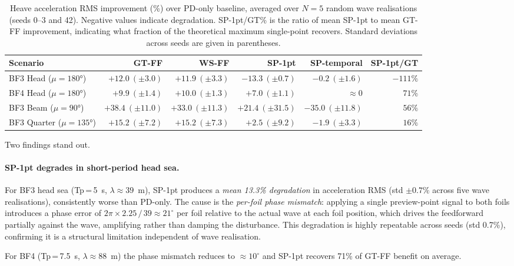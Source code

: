 \documentclass[review]{elsarticle}
\begin{document}
\begin{table}[t]
\centering
\caption{Heave acceleration RMS improvement (\%) over PD-only baseline,
  averaged over $N{=}5$ random wave realisations (seeds 0--3 and 42).
  Negative values indicate degradation.  SP-1pt/GT\% is the ratio of
  mean SP-1pt to mean GT-FF improvement, indicating what fraction of the
  theoretical maximum single-point recovers.  Standard deviations across
  seeds are given in parentheses.}
\label{tab:single_point}
\begin{tabular}{lrrrrr}
\toprule
Scenario & GT-FF & WS-FF & SP-1pt & SP-temporal & SP-1pt/GT \\
\midrule
BF3 Head ($\mu{=}180°$) & $+12.0\ (\pm3.0)$ & $+11.9\ (\pm3.3)$ & $\mathbf{-13.3}\ (\pm0.7)$ & $-0.2\ (\pm1.6)$  & $-111\%$ \\
BF4 Head ($\mu{=}180°$) & $+9.9\  (\pm1.4)$ & $+10.0\ (\pm1.3)$ & $+7.0\ (\pm1.1)$           & $\approx 0$       & $71\%$   \\
BF3 Beam ($\mu{=}90°$)  & $+38.4\ (\pm11.0)$& $+33.0\ (\pm11.3)$& $+21.4\ (\pm31.5)$         & $-35.0\ (\pm11.8)$& $56\%$   \\
BF3 Quarter ($\mu{=}135°$) & $+15.2\ (\pm7.2)$ & $+15.2\ (\pm7.3)$ & $+2.5\ (\pm9.2)$        & $-1.9\ (\pm3.3)$  & $16\%$   \\
\bottomrule
\end{tabular}
\end{table}

Two findings stand out.

\paragraph{SP-1pt degrades in short-period head sea.}
For BF3 head sea (Tp\,=\,5~s, $\lambda \approx 39$~m), SP-1pt produces
a \emph{mean 13.3\% degradation} in acceleration RMS (std $\pm 0.7\%$
across five wave realisations), consistently worse than PD-only.
The cause is the \emph{per-foil phase mismatch}: applying a single
preview-point signal to both foils introduces a phase error of
$2\pi \times 2.25\,/\,39 \approx 21^\circ$ per foil relative to the
actual wave at each foil position, which drives the feedforward partially
against the wave, amplifying rather than damping the disturbance.
This degradation is highly repeatable across seeds (std 0.7\%), confirming
it is a structural limitation independent of wave realisation.

For BF4 (Tp\,=\,7.5~s, $\lambda \approx 88$~m) the phase mismatch reduces
to $\approx 10^\circ$ and SP-1pt recovers 71\% of GT-FF benefit on average.
\end{document}
